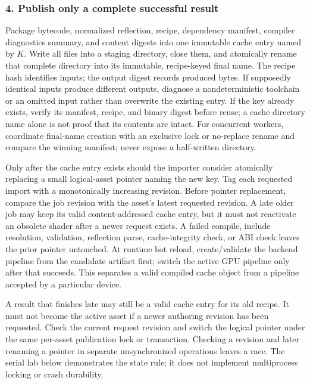 \subsubsection{4. Publish only a complete successful result}\label{05-engine-i-ch010-publish-only-a-complete-successful-result}

Package bytecode, normalized reflection, recipe, dependency manifest, compiler diagnostics summary, and content digests into one immutable cache entry named by \(K\). Write all files into a staging directory, close them, and atomically rename that complete directory into its immutable, recipe-keyed final name. The recipe hash identifies inputs; the output digest records produced bytes. If supposedly identical inputs produce different outputs, diagnose a nondeterministic toolchain or an omitted input rather than overwrite the existing entry. If the key already exists, verify its manifest, recipe, and binary digest before reuse; a cache directory name alone is not proof that its contents are intact. For concurrent workers, coordinate final-name creation with an exclusive lock or no-replace rename and compare the winning manifest; never expose a half-written directory.

Only after the cache entry exists should the importer consider atomically replacing a small logical-asset pointer naming the new key. Tag each requested import with a monotonically increasing revision. Before pointer replacement, compare the job revision with the asset's latest requested revision. A late older job may keep its valid content-addressed cache entry, but it must not reactivate an obsolete shader after a newer request exists. A failed compile, include resolution, validation, reflection parse, cache-integrity check, or ABI check leaves the prior pointer untouched. At runtime hot reload, create/validate the backend pipeline from the candidate artifact first; switch the active GPU pipeline only after that succeeds. This separates a valid compiled cache object from a pipeline accepted by a particular device.

A result that finishes late may still be a valid cache entry for its old recipe. It must not become the active asset if a newer authoring revision has been requested. Check the current request revision and switch the logical pointer under the same per-asset publication lock or transaction. Checking a revision and later renaming a pointer in separate unsynchronized operations leaves a race. The serial lab below demonstrates the state rule; it does not implement multiprocess locking or crash durability.

